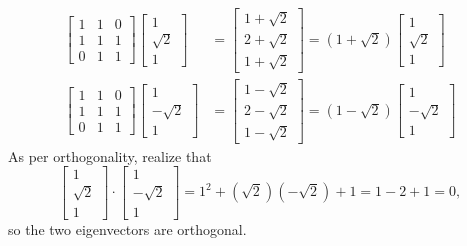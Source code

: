 \documentclass[11pt]{article}
\begin{document}
\begin{align*}
	\begin{bmatrix} 1 & 1 & 0 \\ 1 & 1 & 1 \\ 0 & 1 & 1 \end{bmatrix} \begin{bmatrix} 1 \\ \sqrt{2} \\ 1 \end{bmatrix} &= \begin{bmatrix}  1 + \sqrt{2} \\ 2 + \sqrt{2} \\ 1 + \sqrt{2} \end{bmatrix} = (1 + \sqrt{2})\begin{bmatrix} 1 \\ \sqrt{2} \\ 1 \end{bmatrix} \\
	\begin{bmatrix} 1 & 1 & 0 \\ 1 & 1 & 1 \\ 0 & 1 & 1 \end{bmatrix} \begin{bmatrix} 1 \\ -\sqrt{2} \\ 1 \end{bmatrix} &= \begin{bmatrix} 1 - \sqrt{2} \\ 2 - \sqrt{2} \\ 1 - \sqrt{2} \end{bmatrix} = (1 - \sqrt{2}) \begin{bmatrix} 1 \\ -\sqrt{2} \\ 1 \end{bmatrix}
\end{align*}
As per orthogonality, realize that
\[
	\begin{bmatrix} 1 \\ \sqrt{2} \\ 1 \end{bmatrix} \cdot \begin{bmatrix} 1 \\ -\sqrt{2} \\ 1 \end{bmatrix} = 1^{2} + (\sqrt{2})(-\sqrt{2}) + 1 = 1 -2 + 1 = 0,
\]
so the two eigenvectors are orthogonal.
\end{document}
